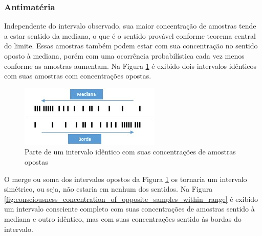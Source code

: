 \subsubsection{Antimatéria}
Independente do intervalo observado, sua maior concentração de amostras tende a estar sentido da mediana, o que é o sentido provável conforme teorema central do limite. Essas amostras também podem estar com sua concentração no sentido oposto à mediana, porém com uma ocorrência probabilística cada vez menos conforme as amostras aumentam. Na Figura \ref{fig:consciousness_concentration_of_opposite_samples} é exibido dois intervalos idênticos com suas amostras com concentrações opostas.
\begin{figure}[H]
\caption{Parte de um intervalo idêntico com suas concentrações de amostras opostas}
\label{fig:consciousness_concentration_of_opposite_samples}
\centering
\includegraphics[scale=1]{sections/images/consciousness_concentration_of_opposite_samples.jpg}
\end{figure}

O merge ou soma dos intervalos opostos da Figura \ref{fig:consciousness_concentration_of_opposite_samples} os tornaria um intervalo simétrico, ou seja, não estaria em nenhum dos sentidos.
Na Figura \ref{fig:consciousness_concentration_of_opposite_samples_within_range} é exibido um intervalo consciente completo com suas concentrações de amostras sentido à mediana e outro idêntico, mas com suas concentrações sentido às bordas do intervalo.

